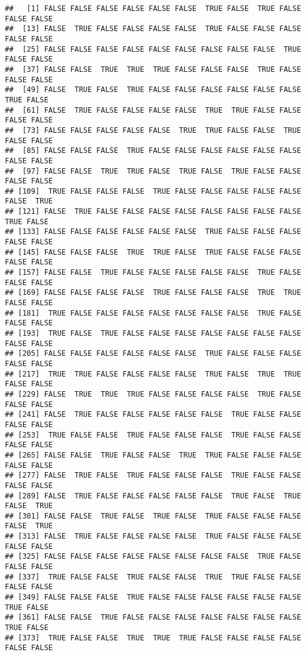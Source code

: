\documentclass[
]{book}
\begin{document}
\begin{verbatim}
##   [1] FALSE FALSE FALSE FALSE FALSE FALSE  TRUE FALSE  TRUE FALSE FALSE FALSE
##  [13] FALSE  TRUE FALSE FALSE FALSE FALSE  TRUE FALSE FALSE FALSE FALSE FALSE
##  [25] FALSE FALSE FALSE FALSE FALSE FALSE FALSE FALSE FALSE  TRUE FALSE FALSE
##  [37] FALSE FALSE  TRUE  TRUE  TRUE FALSE FALSE FALSE  TRUE FALSE FALSE FALSE
##  [49] FALSE  TRUE FALSE  TRUE FALSE FALSE FALSE FALSE FALSE FALSE  TRUE FALSE
##  [61] FALSE  TRUE FALSE FALSE FALSE FALSE  TRUE  TRUE FALSE FALSE FALSE FALSE
##  [73] FALSE FALSE FALSE FALSE FALSE  TRUE  TRUE FALSE FALSE  TRUE FALSE FALSE
##  [85] FALSE FALSE FALSE  TRUE FALSE FALSE FALSE FALSE FALSE FALSE FALSE FALSE
##  [97] FALSE FALSE  TRUE  TRUE FALSE  TRUE FALSE  TRUE FALSE FALSE FALSE FALSE
## [109]  TRUE FALSE FALSE FALSE  TRUE FALSE FALSE FALSE FALSE FALSE FALSE  TRUE
## [121] FALSE  TRUE FALSE FALSE FALSE FALSE FALSE FALSE FALSE FALSE  TRUE FALSE
## [133] FALSE FALSE FALSE FALSE FALSE FALSE  TRUE FALSE FALSE FALSE FALSE FALSE
## [145] FALSE FALSE FALSE  TRUE  TRUE FALSE  TRUE FALSE FALSE FALSE FALSE FALSE
## [157] FALSE FALSE  TRUE FALSE FALSE FALSE FALSE FALSE  TRUE FALSE FALSE FALSE
## [169] FALSE FALSE FALSE FALSE  TRUE FALSE FALSE FALSE  TRUE  TRUE FALSE FALSE
## [181]  TRUE FALSE FALSE FALSE FALSE FALSE FALSE FALSE  TRUE FALSE FALSE FALSE
## [193]  TRUE FALSE  TRUE FALSE FALSE FALSE FALSE FALSE FALSE FALSE FALSE FALSE
## [205] FALSE FALSE FALSE FALSE FALSE FALSE  TRUE FALSE FALSE FALSE FALSE FALSE
## [217]  TRUE  TRUE FALSE FALSE FALSE FALSE  TRUE FALSE  TRUE  TRUE FALSE FALSE
## [229] FALSE  TRUE  TRUE  TRUE FALSE FALSE FALSE FALSE  TRUE FALSE FALSE FALSE
## [241] FALSE  TRUE FALSE FALSE FALSE FALSE FALSE  TRUE FALSE FALSE FALSE FALSE
## [253]  TRUE FALSE FALSE  TRUE FALSE FALSE FALSE  TRUE FALSE FALSE FALSE FALSE
## [265] FALSE FALSE  TRUE FALSE FALSE  TRUE  TRUE FALSE FALSE FALSE FALSE FALSE
## [277] FALSE  TRUE FALSE  TRUE FALSE FALSE FALSE  TRUE FALSE FALSE FALSE FALSE
## [289] FALSE  TRUE FALSE FALSE FALSE FALSE FALSE  TRUE FALSE  TRUE FALSE  TRUE
## [301] FALSE FALSE  TRUE FALSE  TRUE FALSE  TRUE FALSE FALSE FALSE FALSE  TRUE
## [313] FALSE  TRUE FALSE FALSE FALSE FALSE  TRUE FALSE FALSE FALSE FALSE FALSE
## [325] FALSE FALSE FALSE FALSE FALSE FALSE FALSE FALSE  TRUE FALSE FALSE FALSE
## [337]  TRUE FALSE FALSE  TRUE FALSE FALSE  TRUE  TRUE FALSE FALSE FALSE FALSE
## [349] FALSE FALSE FALSE  TRUE FALSE FALSE FALSE FALSE FALSE FALSE  TRUE FALSE
## [361] FALSE FALSE  TRUE FALSE FALSE FALSE FALSE FALSE FALSE FALSE  TRUE FALSE
## [373]  TRUE FALSE FALSE  TRUE  TRUE  TRUE FALSE FALSE FALSE FALSE FALSE FALSE

\end{verbatim}
\end{document}
